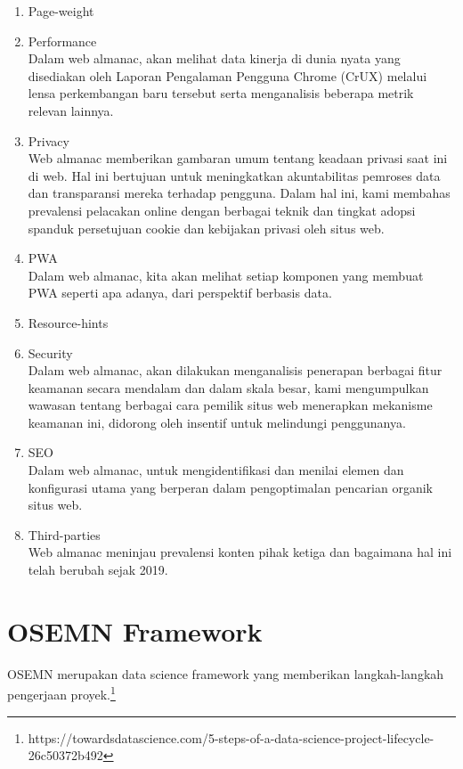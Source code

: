 \begin{enumerate}
	\item Page-weight\\
	
	\item Performance\\
	Dalam web almanac, akan melihat data kinerja di dunia nyata yang disediakan oleh Laporan Pengalaman Pengguna Chrome (CrUX) melalui lensa perkembangan baru tersebut serta menganalisis beberapa metrik relevan lainnya.
	\item Privacy\\
	Web almanac memberikan gambaran umum tentang keadaan privasi saat ini di web. Hal ini bertujuan untuk meningkatkan akuntabilitas pemroses data dan transparansi mereka terhadap pengguna. Dalam hal ini, kami membahas prevalensi pelacakan online dengan berbagai teknik dan tingkat adopsi spanduk persetujuan cookie dan kebijakan privasi oleh situs web.
	\item PWA\\
	Dalam web almanac, kita akan melihat setiap komponen yang membuat PWA seperti apa adanya, dari perspektif berbasis data.
	\item Resource-hints\\
	
	\item Security\\
	Dalam web almanac, akan dilakukan menganalisis penerapan berbagai fitur keamanan secara mendalam dan dalam skala besar, kami mengumpulkan wawasan tentang berbagai cara pemilik situs web menerapkan mekanisme keamanan ini, didorong oleh insentif untuk melindungi penggunanya.
	\item SEO\\
	Dalam web almanac, untuk mengidentifikasi dan menilai elemen dan konfigurasi utama yang berperan dalam pengoptimalan pencarian organik situs web.
	\item Third-parties\\
	Web almanac meninjau prevalensi konten pihak ketiga dan bagaimana hal ini telah berubah sejak 2019.
\end{enumerate}



\section{OSEMN Framework}
OSEMN merupakan data science framework yang memberikan langkah-langkah pengerjaan proyek.\footnote{https://towardsdatascience.com/5-steps-of-a-data-science-project-lifecycle-26c50372b492}
